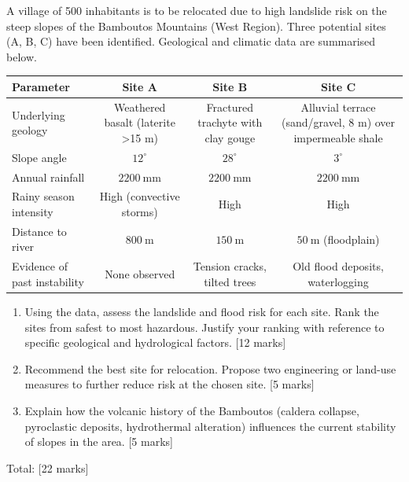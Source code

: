 \documentclass[11pt]{article}
\begin{document}
\begin{exercice}
A village of 500 inhabitants is to be relocated due to high landslide risk on the steep slopes of the Bamboutos Mountains (West Region). Three potential sites (A, B, C) have been identified. Geological and climatic data are summarised below.

\begin{center}
\begin{tabular}{|l|c|c|c|}
\hline
\textbf{Parameter} & \textbf{Site A} & \textbf{Site B} & \textbf{Site C} \\
\hline
Underlying geology & Weathered basalt (laterite >15 m) & Fractured trachyte with clay gouge & Alluvial terrace (sand/gravel, 8 m) over impermeable shale \\
Slope angle & $12^\circ$ & $28^\circ$ & $3^\circ$ \\
Annual rainfall & $2200\ \mathrm{mm}$ & $2200\ \mathrm{mm}$ & $2200\ \mathrm{mm}$ \\
Rainy season intensity & High (convective storms) & High & High \\
Distance to river & $800\ \mathrm{m}$ & $150\ \mathrm{m}$ & $50\ \mathrm{m}$ (floodplain) \\
Evidence of past instability & None observed & Tension cracks, tilted trees & Old flood deposits, waterlogging \\
\hline
\end{tabular}
\end{center}

\begin{enumerate}
\item Using the data, assess the landslide and flood risk for each site. Rank the sites from safest to most hazardous. Justify your ranking with reference to specific geological and hydrological factors. [12 marks]
\item Recommend the best site for relocation. Propose two engineering or land-use measures to further reduce risk at the chosen site. [5 marks]
\item Explain how the volcanic history of the Bamboutos (caldera collapse, pyroclastic deposits, hydrothermal alteration) influences the current stability of slopes in the area. [5 marks]
\end{enumerate}
Total: [22 marks]
\end{exercice}
\end{document}
